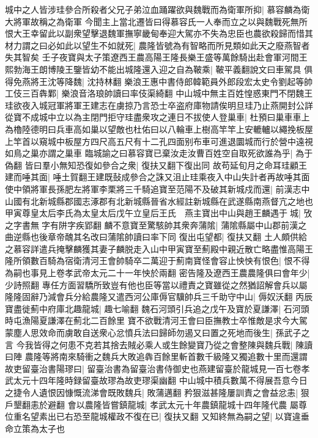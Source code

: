 城中之人皆涉珪參合所殺者父兄子弟泣血踊躍欲與魏戰而為衛軍所抑|{
	慕容麟為衛大將軍故稱之為衛軍}
今聞主上當北遷皆曰得慕容氏一人奉而立之以與魏戰死無所恨大王幸留此以副衆望擊退魏軍撫寧畿甸奉迎大駕亦不失為忠臣也農欲殺歸而惜其材力謂之曰必如此以望生不如就死|{
	農隆皆號為有智略而所見類如此天之廢燕智者失其智矣}
壬子夜寶與太子策遼西王農高陽王隆長樂王盛等萬餘騎出赴會軍河間王熙勃海王朗博陵王鑒皆幼不能出城隆還入迎之自為鞁乘|{
	鞁平義翻說文曰車駕具}
俱得免燕將王沈等降魏|{
	沈持林翻}
樂浪王惠中書侍郎韓範員外郎段宏太史令劉起等帥工伎三百犇鄴|{
	樂浪音洛琅帥讀曰率伎渠綺翻}
中山城中無主百姓惶惑東門不閉魏王珪欲夜入城冠軍將軍王建志在虜掠乃言恐士卒盗府庫物請俟明旦珪乃止燕開封公詳從寶不成城中立以為主閉門拒守珪盡衆攻之連日不拔使人登巢車|{
	杜預曰巢車車上為櫓陸德明曰兵車高如巢以望敵也杜佑曰以八輪車上樹高竿竿上安轆轤以繩挽板屋上竿首以窺城中板屋方四尺高五尺有十二孔四面别布車可進退圜城而行於營中遠視如鳥之巢亦謂之巢車}
臨城諭之曰慕容寶已棄汝走汝曹百姓空自取死欲誰為乎|{
	為于偽翻}
皆曰羣小無知恐復如參合之衆|{
	復扶又翻下復出同}
故苟延旬月之命耳珪顧王建而唾其面|{
	唾土賀翻王建既鼔成參合之誅又沮止珪乘夜入中山失計者再故唾其面}
使中領將軍長孫肥左將軍李栗將三千騎追寶至范陽不及破其新城戍而還|{
	前漢志中山國有北新城縣郡國志涿郡有北新城縣晉省水經註新城縣在武遂縣南燕督亢之地也}
甲寅尊皇太后李氏為太皇太后戊午立皇后王氏　燕主寶出中山與趙王麟遇于城|{
	攷之字書無字有阱字疾郢翻}
麟不意寶至驚駭帥其衆奔蒲隂|{
	蒲隂縣屬中山郡前漢之曲逆縣也後章帝醜其名改曰蒲隂帥讀曰率下同}
復出屯望都|{
	復扶又翻}
土人頗供給之慕容詳遣兵掩擊麟獲其妻子麟脱走入山中甲寅寶至薊殿中親近散亡略盡惟高陽王隆所領數百騎為宿衛清河王會帥騎卒二萬迎于薊南寶怪會容止怏怏有恨色|{
	恨不得為嗣也事見上卷孝武帝太元二十一年怏於兩翻}
密告隆及遼西王農農隆俱曰會年少|{
	少詩照翻}
專任方面習驕所致豈有他也臣等當以禮責之寶雖從之然猶詔解會兵以屬隆隆固辭乃減會兵分給農隆又遣西河公庫傉官驥帥兵三千助守中山|{
	傉奴沃翻}
丙辰寶盡徙薊中府庫北趣龍城|{
	趣七喻翻}
魏石河頭引兵追之戊午及寶於夏謙澤|{
	石河頭時屯漁陽夏謙澤在薊北二百餘里}
寶不欲戰清河王會曰臣撫教士卒惟敵是求今大駕蒙塵人思效命而虜敢自送衆心忿憤兵法曰歸師勿遏又曰置之死地而後生|{
	孫武子之言}
今我皆得之何患不克若其捨去賊必乘人或生餘變寶乃從之會整陳與魏兵戰|{
	陳讀曰陣}
農隆等將南來騎衝之魏兵大敗追犇百餘里斬首數千級隆又獨追數十里而還謂故吏留臺治書陽璆曰|{
	留臺治書為留臺治書侍御史也燕建留臺於龍城見一百七卷孝武太元十四年隆時録留臺故璆為故吏璆渠幽翻}
中山城中積兵數萬不得展吾意今日之捷令人遺恨因慷慨流涕會既敗魏兵|{
	敗蒲邁翻}
矜狠滋甚隆屢訓責之會益忿恚|{
	狠戶墾翻恚於避翻}
會以農隆皆嘗鎮龍城|{
	孝武太元十年農鎮龍城十四年隆代農}
屬尊位重名望素出已右恐至龍城權政不復在已|{
	復扶又翻}
又知終無為嗣之望|{
	以寶違垂命立策為太子也}
